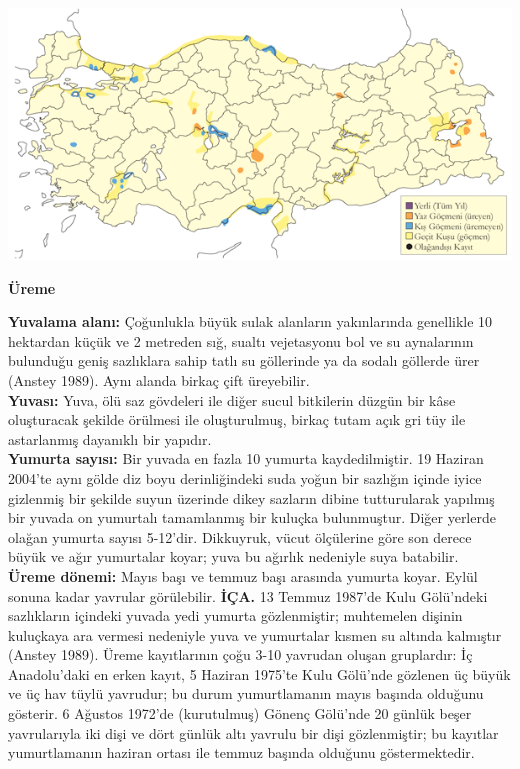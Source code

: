 \documentclass[
  letterpaper,
  DIV=11,
  numbers=noendperiod]{scrreprt}
\begin{document}
\includegraphics{images/harita_Page_035.png}

\textbf{Üreme}

\textbf{Yuvalama alanı:} Çoğunlukla büyük sulak alanların yakınlarında
genellikle 10 hektardan küçük ve 2 metreden sığ, sualtı vejetasyonu bol
ve su aynalarının bulunduğu geniş sazlıklara sahip tatlı su göllerinde
ya da sodalı göllerde ürer (Anstey 1989). Aynı alanda birkaç çift
üreyebilir.\\
\textbf{Yuvası:} Yuva, ölü saz gövdeleri ile diğer sucul bitkilerin
düzgün bir kâse oluşturacak şekilde örülmesi ile oluşturulmuş, birkaç
tutam açık gri tüy ile astarlanmış dayanıklı bir yapıdır.\\
\textbf{Yumurta sayısı:} Bir yuvada en fazla 10 yumurta kaydedilmiştir.
19 Haziran 2004'te aynı gölde diz boyu derinliğindeki suda yoğun bir
sazlığın içinde iyice gizlenmiş bir şekilde suyun üzerinde dikey
sazların dibine tutturularak yapılmış bir yuvada on yumurtalı
tamamlanmış bir kuluçka bulunmuştur. Diğer yerlerde olağan yumurta
sayısı 5-12'dir. Dikkuyruk, vücut ölçülerine göre son derece büyük ve
ağır yumurtalar koyar; yuva bu ağırlık nedeniyle suya batabilir.\\
\textbf{Üreme dönemi:} Mayıs başı ve temmuz başı arasında yumurta koyar.
Eylül sonuna kadar yavrular görülebilir. \textbf{İÇA.} 13 Temmuz 1987'de
Kulu Gölü'ndeki sazlıkların içindeki yuvada yedi yumurta gözlenmiştir;
muhtemelen dişinin kuluçkaya ara vermesi nedeniyle yuva ve yumurtalar
kısmen su altında kalmıştır (Anstey 1989). Üreme kayıtlarının çoğu 3-10
yavrudan oluşan gruplardır: İç Anadolu'daki en erken kayıt, 5 Haziran
1975'te Kulu Gölü'nde gözlenen üç büyük ve üç hav tüylü yavrudur; bu
durum yumurtlamanın mayıs başında olduğunu gösterir. 6 Ağustos 1972'de
(kurutulmuş) Gönenç Gölü'nde 20 günlük beşer yavrularıyla iki dişi ve
dört günlük altı yavrulu bir dişi gözlenmiştir; bu kayıtlar
yumurtlamanın haziran ortası ile temmuz başında olduğunu göstermektedir.
\end{document}
